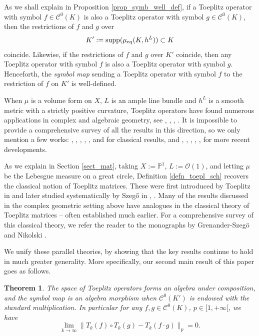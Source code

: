 \documentclass[12pt]{article}
\numberwithin{equation}{section}
\theoremstyle{theorem}
\newtheorem{thm}{Theorem}[section]
\theoremstyle{definition}
\theoremstyle{remark}
\newcommand{\ccal}{\mathscr{C}}
\begin{document}
	\par 
	As we shall explain in Proposition \ref{prop_symb_well_def}, if a Toeplitz operator with symbol $f \in \ccal^0(K)$ is also a Toeplitz operator with symbol $g \in \ccal^0(K)$, then the restrictions of $f$ and $g$ over 
	\begin{equation}\label{eq_kprim}
		K' := {\rm{supp}}(\mu_{\mathrm{eq}}(K, h^L)) \subset K
	\end{equation}
	coincide.
	Likewise, if the restrictions of $f$ and $g$ over $K'$ coincide, then any Toeplitz operator with symbol $f$ is also a Toeplitz operator with symbol $g$.
	Henceforth, the \textit{symbol map} sending a Toeplitz operator with symbol $f$ to the restriction of $f$ on $K'$ is well-defined.	
	\par 
	When $\mu$ is a volume form on $X$, $L$ is an ample line bundle and $h^L$ is a smooth metric with a strictly positive curvature, Toeplitz operators have found numerous applications in complex and algebraic geometry, see \cite{BerndtProb}, \cite{MaZhangSuperconnBKPubl}, \cite{FinSubmToepl}, \cite{FinHNII}. 
	It is impossible to provide a comprehensive survey of all the results in this direction, so we only mention a few works: \cite{BoutGuillSpecToepl}, \cite{BordMeinSchli}, \cite{CharlesToepl}, \cite{MaMarinGeneralizedBK}, \cite{MaMarBTKah}, and \cite{MaHol} for classical results, and \cite{AnconaFloch}, \cite{HerrmanHsiaoMarinShen}, \cite{DrewLiuMar2}, \cite{GalassoHsiao}, \cite{DelepSpec1}, \cite{OodOffDiag} for more recent developments.
	\par 
	As we explain in Section \ref{sect_mat}, taking $X := \mathbb{P}^1$, $L := \mathscr{O}(1)$, and letting $\mu$ be the Lebesgue measure on a great circle, Definition \ref{defn_toepl_sch} recovers the classical notion of Toeplitz matrices. 
	These were first introduced by Toeplitz in \cite{Toeplitz} and later studied systematically by Szeg\H{o} in \cite{SzegoFST}, \cite{SzegoSND}.  
	Many of the results discussed in the complex geometric setting above have analogues in the classical theory of Toeplitz matrices -- often established much earlier.  
	For a comprehensive survey of this classical theory, we refer the reader to the monographs by Grenander-Szeg{\"o} \cite{GrenanSzego} and Nikolski \cite{NikolskiBook}.
	\par 
	We unify these parallel theories, by showing that the key results continue to hold in much greater generality.
	More specifically, our second main result of this paper goes as follows.
	\begin{thm}\label{thm_alg}
		The space of Toeplitz operators forms an algebra under composition, and the symbol map is an algebra morphism when $\ccal^0(K')$ is endowed with the standard multiplication.
		In particular for any $f, g \in \ccal^0(K)$, $p \in [1, +\infty[$, we have 
		\begin{equation}\label{eq_toepl_comp_as}
			\lim_{k \to \infty} \| T_k(f) \circ T_k(g) - T_k(f \cdot g) \|_p = 0.
		\end{equation}
	\end{thm}
\end{document}
